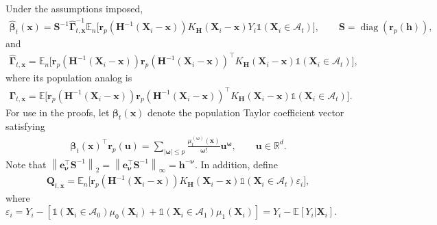 \documentclass[10pt]{article}
\DeclareMathOperator*{\diag}{diag}
\newcommand{\E}{\mathbb{E}}
\newcommand{\Indicator}{\mathds{1}}
\newcommand{\En}{\mathbb{E}_n}
\newcommand{\reals}{\mathbb{R}}
\newcommand{\norm}[1]{\left\lVert#1\right\rVert}
\newcommand{\be}{\mathbf{e}}
\newcommand{\bh}{\mathbf{h}}
\newcommand{\bH}{\mathbf{H}}
\newcommand{\bQ}{\mathbf{Q}}
\newcommand{\br}{\mathbf{r}}
\newcommand{\bS}{\mathbf{S}}
\newcommand{\bu}{\mathbf{u}}
\newcommand{\bx}{\mathbf{x}}
\newcommand{\bX}{\mathbf{X}}
\newcommand{\bbeta}{\boldsymbol{\beta}}
\newcommand{\bnu}{\boldsymbol{\nu}}
\newcommand{\bomega}{\boldsymbol{\omega}}
\newcommand{\bGamma}{\boldsymbol{\Gamma}}
\newcommand{\Gammax}{\boldsymbol{\Gamma}_{t, \bx}}
\newcommand{\A}{\mathcal{A}}
\begin{document}
Under the assumptions imposed,
\begin{align*}
    \widehat{\bbeta}_{t}(\bx)
    = \bS^{-1} \widehat{\bGamma}_{t,\bx}^{-1} \En \big[\br_p(\bH^{-1}(\bX_i-\bx)) K_{\bH}(\bX_i - \bx) Y_i \Indicator(\bX_i \in \A_t) \big],
    \qquad
    \bS = \diag(\br_p(\bh)),
\end{align*}
and
\begin{align*}
    \widehat{\bGamma}_{t,\bx} = \En \big[ \br_p(\bH^{-1}(\bX_i-\bx)) \br_p(\bH^{-1}(\bX_i-\bx))^{\top} K_{\bH}(\bX_i - \bx) \Indicator(\bX_i \in \A_t)\big],
\end{align*}
where its population analog is
\begin{align*}
    \Gammax = \E \big[\br_p(\bH^{-1}(\bX_i-\bx)) \br_p(\bH^{-1}(\bX_i-\bx))^{\top} K_{\bH}(\bX_i - \bx) \Indicator(\bX_i \in \A_t) \big].
\end{align*}
For use in the proofs, let $\bbeta_t(\bx)$ denote the population Taylor coefficient vector satisfying
\begin{align*}
    \bbeta_t(\bx)^\top\br_p(\bu)
    = \sum_{|\bomega|\leq p}\frac{\mu_t^{(\bomega)}(\bx)}{\bomega!}\bu^{\bomega},
    \qquad \bu\in\reals^d.
\end{align*}
Note that $\norm{\be_{\bnu}^\top \bS^{-1}}_2 = \norm{\be_{\bnu}^\top \bS^{-1}}_{\infty} = \bh^{-\bnu}$. In addition, define
\begin{align*}
    \bQ_{t,\bx} = \En \big[\br_p(\bH^{-1}(\bX_i-\bx)) K_{\bH}(\bX_i - \bx) \Indicator(\bX_i \in \A_t) \varepsilon_i\big],
\end{align*}
where $\varepsilon_i = Y_i - [\Indicator(\bX_i \in \A_0) \mu_0(\bX_i) + \Indicator(\bX_i \in \A_1) \mu_1(\bX_i)] = Y_i - \E[Y_i|\bX_i]$.
\end{document}

